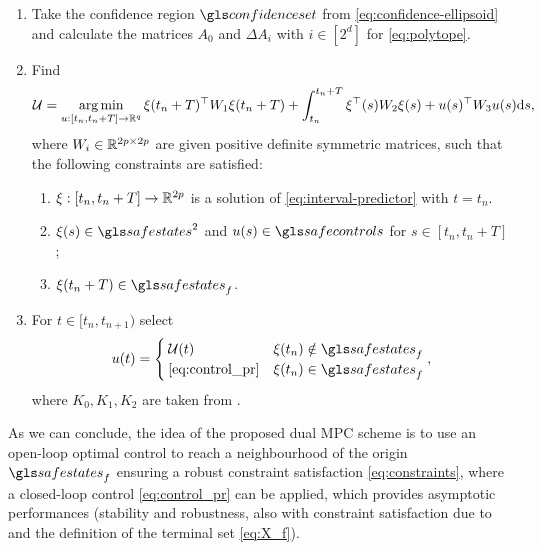 \begin{enumerate}
	\item Take the confidence region $\confidenceset$ from \eqref{eq:confidence-ellipsoid} and calculate the matrices $A_{0}$ and $\Delta A_{i}$ with $i\in[2^d]$ for \eqref{eq:polytope}.
	\item Find
	\begin{equation}
	\label{eq:OCP}
	\mathcal{U}=\operatorname*{arg\,min}_{u:[t_{n},t_{n}+T]\to\mathbb{R}^{q}}\xi(t_{n}+T)^{\top}W_{1}\xi(t_{n}+T)
	+\int_{t_{n}}^{t_{n}+T}\xi^{\top}(s)W_{2}\xi(s)+u(s)^{\top}W_{3}u(s)\mathrm{d} s, 
	\end{equation}
	where $W_{i}\in\mathbb{R}^{2p\times2p}$ are given positive definite symmetric
	matrices, such that the following constraints are satisfied: 
	\begin{enumerate}
		\item $\xi:[t_{n},t_{n}+T]\to\mathbb{R}^{2p}$ is a solution of \eqref{eq:interval-predictor}
		with $t=t_{n}$.
		\item $\xi(s)\in\safestates^{2}$ and $u(s)\in\safecontrols$ for $s\in[t_{n},t_{n}+T]$; 
		\item $\xi(t_{n}+T)\in\safestates_{f}$.
	\end{enumerate}
	\item For $t\in[t_{n},t_{n+1})$ select
	\begin{equation}
	u(t)=\begin{cases}
	\cU(t) & \xi(t_{n})\notin\safestates_{f}\\
	\eqref{eq:control_pr} & \xi(t_{n})\in\safestates_{f}
	\end{cases},\label{eq:control}
	\end{equation}
	where $K_{0},K_{1},K_{2}$ are taken from .
\end{enumerate}
As we can conclude, the idea of the proposed dual \gls{MPC} scheme \citep[see also][]{Michalska1993,Mayne2000,Mayne2009} is to use an open-loop optimal control to reach a neighbourhood of the origin $\safestates_{f}$ ensuring a robust constraint satisfaction \eqref{eq:constraints}, where a closed-loop control \eqref{eq:control_pr} can be applied, which provides asymptotic performances (stability and robustness, also with constraint satisfaction due to  and the definition of the terminal set \eqref{eq:X_f}). 

